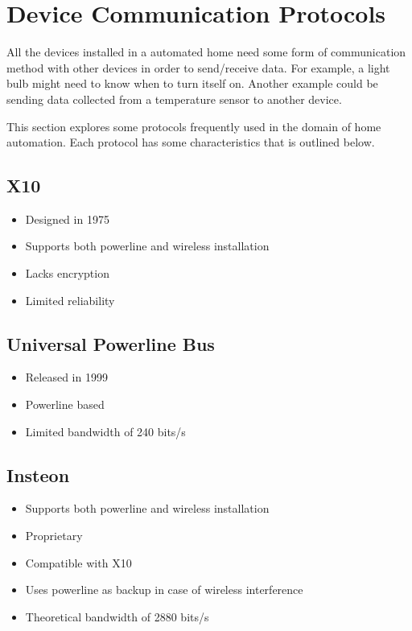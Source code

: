 \section{Device Communication Protocols}

All the devices installed in a automated home need some form of communication
method with other devices in order to send/receive data. For example, a light
bulb might need to know when to turn itself on. Another example could be
sending data collected from a temperature sensor to another device.

This section explores some protocols frequently used in the domain of home
automation. Each protocol has some characteristics that is outlined below.

\subsection{X10} \cite{wiki_x10}

\begin{itemize}
\item Designed in 1975
\item Supports both powerline and wireless installation
\item Lacks encryption
\item Limited reliability
\end{itemize}


\subsection{Universal Powerline Bus} \cite{wiki_upb}

\begin{itemize}
\item Released in 1999
\item Powerline based
\item Limited bandwidth of 240 bits/s
\end{itemize}


\subsection{Insteon} \cite{wiki_insteon}

\begin{itemize}
\item Supports both powerline and wireless installation
\item Proprietary
\item Compatible with X10
\item Uses powerline as backup in case of wireless interference
\item Theoretical bandwidth of 2880 bits/s
\end{itemize}


